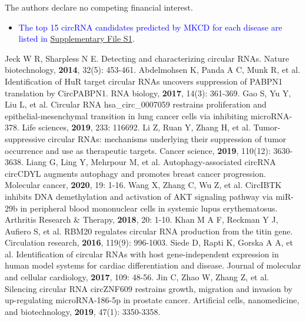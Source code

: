 \documentclass[journal=jcisd8,manuscript=article]{achemso}
\begin{document}
\begin{suppinfo}

\vspace{-0.3cm}
The authors declare no competing financial interest.
\begin{itemize}
    \item \textcolor{blue}{The top 15 circRNA candidates predicted by MKCD for each disease are listed in \href{https://github.com/pingxuan-hlju/MKCD}{Supplementary File S1}.}
\end{itemize}
\end{suppinfo}

% 
\begin{thebibliography}{}
Jeck W R, Sharpless N E. Detecting and characterizing circular RNAs. Nature biotechnology, \textbf{2014}, 32(5): 453-461.
Abdelmohsen K, Panda A C, Munk R, et al. Identification of HuR target circular RNAs uncovers suppression of PABPN1 translation by CircPABPN1. RNA biology, \textbf{2017}, 14(3): 361-369.
Gao S, Yu Y, Liu L, et al. Circular RNA hsa\_circ\_0007059 restrains proliferation and epithelial-mesenchymal transition in lung cancer cells via inhibiting microRNA-378. Life sciences, \textbf{2019}, 233: 116692.
Li Z, Ruan Y, Zhang H, et al. Tumor‐suppressive circular RNAs: mechanisms underlying their suppression of tumor occurrence and use as therapeutic targets. Cancer science, \textbf{2019}, 110(12): 3630-3638.
Liang G, Ling Y, Mehrpour M, et al. Autophagy-associated circRNA circCDYL augments autophagy and promotes breast cancer progression. Molecular cancer, \textbf{2020}, 19: 1-16.
Wang X, Zhang C, Wu Z, et al. CircIBTK inhibits DNA demethylation and activation of AKT signaling pathway via miR-29b in peripheral blood mononuclear cells in systemic lupus erythematosus. Arthritis Research \& Therapy, \textbf{2018}, 20: 1-10.
Khan M A F, Reckman Y J, Aufiero S, et al. RBM20 regulates circular RNA production from the titin gene. Circulation research, \textbf{2016}, 119(9): 996-1003.
Siede D, Rapti K, Gorska A A, et al. Identification of circular RNAs with host gene-independent expression in human model systems for cardiac differentiation and disease. Journal of molecular and cellular cardiology, \textbf{2017}, 109: 48-56.
Jin C, Zhao W, Zhang Z, et al. Silencing circular RNA circZNF609 restrains growth, migration and invasion by up-regulating microRNA-186-5p in prostate cancer. Artificial cells, nanomedicine, and biotechnology, \textbf{2019}, 47(1): 3350-3358.

\end{thebibliography}
\end{document}
